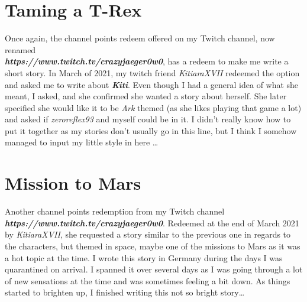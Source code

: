 \documentclass[a4paper,onecolumn,11pt]{article}
\begin{document}

\section{Taming a T-Rex}

Once again, the channel points redeem offered on my Twitch channel, now renamed \\\textbf{\textit{https://www.twitch.tv/crazyjaeger0w0}}, has a redeem to make me write a short story. In March of 2021, my twitch friend \textit{KitiaraXVII} redeemed the option and asked me to write about \textbf{\textit{Kiti}}. Even though I had a general idea of what she meant, I asked, and she confirmed she wanted a story about herself. She later specified she would like it to be \textit{Ark} themed (as she likes playing that game a lot) and asked if \textit{zeroreflex93} and myself could be in it. I didn’t really know how to put it together as my stories don’t usually go in this line, but I think I somehow managed to input my little style in here \ldots


\section{Mission to Mars}

Another channel points redemption from my Twitch channel \textbf{\textit{https://www.twitch.tv/crazyjaeger0w0}}. Redeemed at the end of March 2021 by \textit{KitiaraXVII}, she requested a story similar to the previous one in regards to the characters, but themed in space, maybe one of the missions to Mars as it was a hot topic at the time. I wrote this story in Germany during the days I was quarantined on arrival. I spanned it over several days as I was going through a lot of new sensations at the time and was sometimes feeling a bit down. As things started to brighten up, I finished writing this not so bright story\ldots


\end{document}
